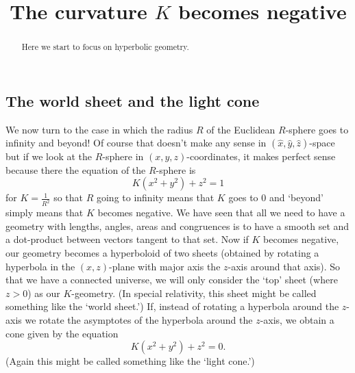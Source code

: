 \documentclass{ximera}
\title{The curvature $K$ becomes negative}
\begin{document}
\begin{abstract}
Here we start to focus on hyperbolic geometry.
\end{abstract}
\maketitle

\subsection*{The world sheet and the light cone}

We now turn to the case in which the radius $R$ of the Euclidean
$R$-sphere goes to infinity and beyond! Of course that doesn't make
any sense in $\left( \hat{x},\hat{y},\hat{z}\right) $-space but if we
look at the $R$-sphere in $\left( x,y,z\right) $-coordinates, it makes
perfect sense because there the equation of the $R$-sphere is%
\begin{equation}
K\left(  x^{2}+y^{2}\right)  +z^{2}=1 \label{81}%
\end{equation}
for $K=\frac{1}{R^{2}}$ so that $R$ going to infinity means that $K$
goes to $0$ and `beyond' simply means that $K$ becomes negative. We
have seen that all we need to have a geometry with lengths, angles,
areas and congruences is to have a smooth set and a dot-product
between vectors tangent to that set. Now if $K$ becomes negative, our
geometry becomes a hyperboloid of two sheets (obtained by rotating a
hyperbola in the $\left( x,z\right) $-plane with major axis the
$z$-axis around that axis). So that we have a connected universe, we
will only consider the `top' sheet (where $z>0$) as our
$K$-geometry. (In special relativity, this sheet might be called
something like the `world sheet.') If, instead of rotating a hyperbola
around the $z$-axis we rotate the asymptotes of the hyperbola around
the $z$-axis, we obtain a cone given by the equation%
\[
K\left(  x^{2}+y^{2}\right)  +z^{2}=0.
\]
(Again this might be called something like the `light cone.')
\end{document}
